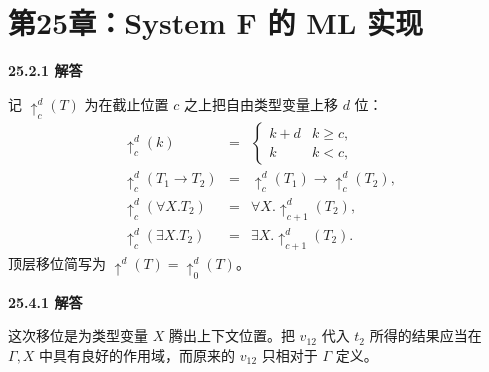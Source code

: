 \newpage
\section{第25章：System F 的 ML 实现}

\begin{taplauthorsolutionentrybox}
\label{sol:author:25.2.1}
\textbf{25.2.1 解答}

记 \(\uparrow_c^d(T)\) 为在截止位置 \(c\) 之上把自由类型变量上移 \(d\)
位：
\[
\begin{array}{rcl}
\uparrow_c^d(k)&=&
 \begin{cases}
 k+d&k\geq c,\\
 k&k<c,
 \end{cases}\\
\uparrow_c^d(T_1\to T_2)&=&
 \uparrow_c^d(T_1)\to\uparrow_c^d(T_2),\\
\uparrow_c^d(\forall X.T_2)&=&
 \forall X.\uparrow_{c+1}^d(T_2),\\
\uparrow_c^d(\exists X.T_2)&=&
 \exists X.\uparrow_{c+1}^d(T_2).
\end{array}
\]
顶层移位简写为 \(\uparrow^d(T)=\uparrow_0^d(T)\)。
\end{taplauthorsolutionentrybox}


\begin{taplauthorsolutionentrybox}
\label{sol:author:25.4.1}
\textbf{25.4.1 解答}

这次移位是为类型变量 \(X\) 腾出上下文位置。把 \(v_{12}\) 代入 \(t_2\)
所得的结果应当在 \(\Gamma,X\) 中具有良好的作用域，而原来的 \(v_{12}\)
只相对于 \(\Gamma\) 定义。
\end{taplauthorsolutionentrybox}

